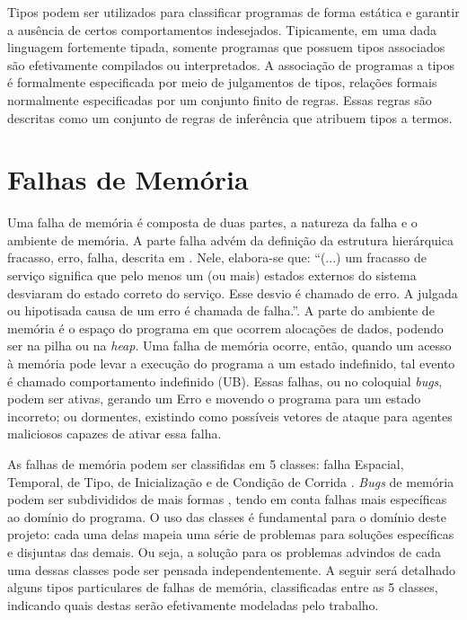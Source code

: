Tipos podem ser utilizados para classificar programas de forma estática e garantir a ausência de certos comportamentos indesejados. Tipicamente, em uma dada linguagem fortemente tipada, somente programas que possuem tipos associados são efetivamente compilados ou interpretados. A associação de programas a tipos é formalmente especificada por meio de julgamentos de tipos, relações formais normalmente especificadas por um conjunto finito de regras. Essas regras são descritas como um conjunto de regras de inferência que atribuem tipos a termos. 


\section{Falhas de Memória}
\label{sec:mem-error}

Uma falha de memória é composta de duas partes, a natureza da falha e o ambiente de memória. A parte falha advém da definição da estrutura hierárquica fracasso, erro, falha, descrita em \citet{FAULTS}. Nele, elabora-se que: ``(...) um fracasso de serviço significa que pelo menos um (ou mais) estados externos do sistema desviaram do estado correto do serviço. Esse desvio é chamado de erro. A julgada ou hipotisada causa de um erro é chamada de falha.''\cite[p. 13, tradução nossa]{FAULTS}. A parte do ambiente de memória é o espaço do programa em que ocorrem alocações de dados, podendo ser na pilha ou na \emph{heap}. Uma falha de memória ocorre, então, quando um acesso à memória pode levar a execução do programa a um estado indefinido, tal evento é chamado comportamento indefinido (UB). Essas falhas, ou no coloquial \emph{bugs}, podem ser ativas, gerando um Erro e movendo o programa para um estado incorreto; ou dormentes, existindo como possíveis vetores de ataque para agentes maliciosos capazes de ativar essa falha. 

As falhas de memória podem ser classifidas em 5 classes: falha Espacial, Temporal, de Tipo, de Inicialização e de Condição de Corrida \cite{Apple22,Google24}. \emph{Bugs} de memória podem ser subdivididos de mais formas \cite{7KINGDOMS,CWELIST}, tendo em conta falhas mais específicas ao domínio do programa. O uso das classes é fundamental para o domínio deste projeto: cada uma delas mapeia uma série de problemas para soluções específicas e disjuntas das demais.  Ou seja, a solução para os problemas advindos de cada uma dessas classes pode ser pensada independentemente. A seguir será detalhado alguns tipos particulares de falhas de memória, classificadas entre as 5 classes, indicando quais destas serão efetivamente modeladas pelo trabalho.

